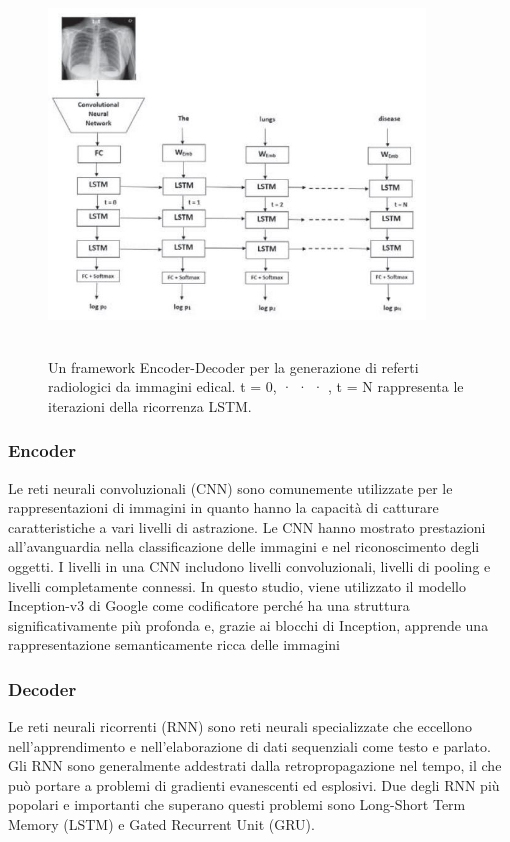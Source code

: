 \documentclass[12pt,a4paper]{report}
\begin{document}
\begin{figure}[h!]
    \begin{center}
        \includegraphics[width=10cm,height=10cm,keepaspectratio]{LSTM}
    \end{center}
    \caption{Un framework Encoder-Decoder per la generazione di referti radiologici da immagini edical. t = 0, · · · , t = N rappresenta le iterazioni della ricorrenza LSTM.}
    \label{fig:LSTM}
\end{figure}


\subsubsection{Encoder}
Le reti neurali convoluzionali (CNN) sono comunemente utilizzate per le rappresentazioni di immagini in quanto hanno la capacità di catturare caratteristiche a vari livelli di astrazione. Le CNN hanno mostrato prestazioni all'avanguardia nella classificazione delle immagini e nel riconoscimento degli oggetti. I livelli in una CNN includono livelli convoluzionali, livelli di pooling e livelli completamente connessi. 
In questo studio, viene utilizzato il modello Inception-v3 di Google come codificatore perché ha una struttura significativamente più profonda e, grazie ai blocchi di Inception, apprende una rappresentazione semanticamente ricca delle immagini

\subsubsection{Decoder}
Le reti neurali ricorrenti (RNN) sono reti neurali specializzate che eccellono nell'apprendimento e nell'elaborazione di dati sequenziali come testo e parlato. Gli RNN sono generalmente addestrati dalla retropropagazione nel tempo, il che può portare a problemi di gradienti evanescenti ed esplosivi. Due degli RNN più popolari e importanti che superano questi problemi sono Long-Short Term Memory (LSTM) e Gated Recurrent Unit (GRU).
\end{document}
